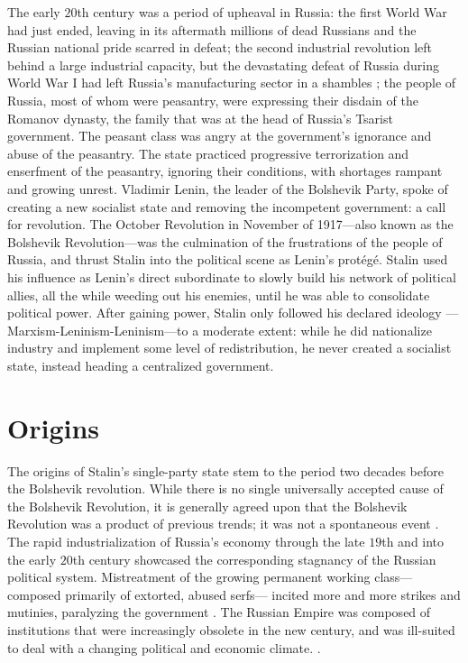 \documentclass[a4paper,12pt]{article}
\begin{document}
    
    

    The early $20$th century was a period of upheaval in Russia: the first World War had just ended,
    leaving in its aftermath millions of dead Russians and the Russian national pride scarred in
    defeat; the second industrial revolution left behind a large industrial capacity, but the
    devastating defeat of Russia during World War I had left Russia's manufacturing sector in a
    shambles \cite[39]{danielsr}; the people of Russia, most of whom were peasantry, were expressing
    their disdain of the Romanov dynasty, the family that was at the head of Russia's Tsarist
    government. The peasant class was angry at the government's ignorance and abuse of the
    peasantry. The state practiced progressive terrorization and enserfment of the peasantry,
    ignoring their conditions, with shortages rampant and growing unrest. Vladimir Lenin, the leader
    of the Bolshevik Party, spoke of creating a new socialist state and removing the incompetent
    government: a call for revolution. The October Revolution in November of 1917---also known as
    the Bolshevik Revolution---was the culmination of the frustrations of the people of Russia, and
    thrust Stalin into the political scene as Lenin's protégé. Stalin used his influence as Lenin's
    direct subordinate to slowly build his network of political allies, all the while weeding out
    his enemies, until he was able to consolidate political power. After gaining power, Stalin only
    followed his declared ideology ---Marxism-Leninism-Leninism---to a moderate extent: while he did
    nationalize industry and implement some level of redistribution, he never created a socialist
    state, instead heading a centralized government.


    \section{Origins}

        The origins of Stalin's single-party state stem to the period two decades before the
        Bolshevik revolution. While there is no single universally accepted cause of the Bolshevik
        Revolution, it is generally agreed upon that the Bolshevik Revolution was a product of
        previous trends; it was not a spontaneous event \cite[331]{danielsr}. The rapid
        industrialization of Russia's economy through the late $19$th and into the early $20$th
        century showcased the corresponding stagnancy of the Russian political system. Mistreatment
        of the growing permanent working class---composed primarily of extorted, abused serfs---
        incited more and more strikes and mutinies, paralyzing the government \cite[32]{pitirims}.
        The Russian Empire was composed of institutions that were increasingly obsolete in the new
        century, and was ill-suited to deal with a changing political and economic climate.
        \cite[18]{pitirims}.
\end{document}
